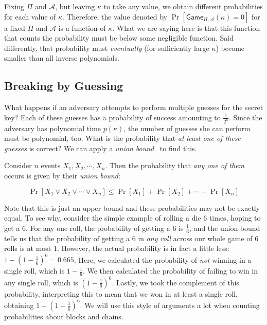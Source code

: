 Fixing $\Pi$ and $\mathcal{A}$, but leaving $\kappa$
to take any value, we obtain different probabilities for each value of $\kappa$. Therefore,
the value denoted by $\Pr[\textsf{Game}_{\Pi,\mathcal{A}}(\kappa) = 0]$ for a fixed $\Pi$ and
$\mathcal{A}$ is a function of $\kappa$. What we are saying here is that this function that
counts the probability must be below some negligible function. Said differently, that probability
must \emph{eventually} (for sufficiently large $\kappa$) become smaller than all inverse polynomials.

\subsection*{Breaking by Guessing}

What happens if an adversary attempts to perform multiple guesses for the secret key?
Each of these guesses has a probability of success amounting to $\frac{1}{2^\kappa}$.
Since the adversary has polynomial time $p(\kappa)$, the number of guesses she can
perform must be polynomial, too. What is the probability that \emph{at least one of
these guesses} is correct? We can apply a \emph{union bound}~\cite{ross} to find this.

\begin{theorem}
  Consider $n$ events $X_1, X_2, \cdots, X_n$. Then the probability
  that \emph{any one of them} occurs is given by their \emph{union bound}:

  \[
    \Pr[X_1 \lor X_2 \lor \cdots \lor X_n] \leq \Pr[X_1] + \Pr[X_2] + \cdots + \Pr[X_n]
  \]
\end{theorem}

Note that this is just an upper bound and these probabilities may not be exactly
equal. To see why, consider the simple example of rolling a die $6$ times, hoping
to get a $6$. For any one roll, the probability of getting a $6$ is $\frac{1}{6}$,
and the union bound tells us that the probability of getting a $6$ in \emph{any
roll} across our whole game of $6$ rolls is at most $1$. However, the actual probability
is in fact a little less: $1 - (1 - \frac{1}{6})^6 = 0.665$. Here, we calculated
the probability of \emph{not} winning in a single roll, which is $1 - \frac{1}{6}$.
We then calculated the probability of failing to win in any single roll, which is
$(1 - \frac{1}{6})^6$. Lastly, we took the complement of this probability, interpreting
this to mean that we won in at least a single roll, obtaining $1 - (1 - \frac{1}{6})^6$.
We will use this style of arguments a lot when counting probabilities about blocks
and chains.

